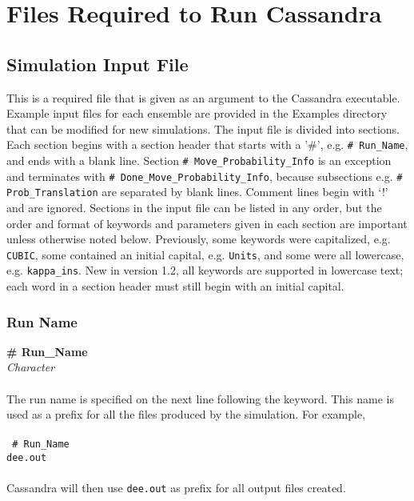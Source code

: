 \chapter{Files Required to Run Cassandra}
\label{ch:input_files}

\section{Simulation Input File} \label{sec:Input_File}
This is a required file that is given as an argument to the Cassandra executable.
Example input files for each ensemble are provided in the Examples directory that can be
modified for new simulations.
The input file is divided into sections.
Each section begins with a section header that starts with a '\#',
e.g. {\tt\# Run\_Name}, and ends with a blank line.
Section {\tt\# Move\_Probability\_Info} is an exception and terminates with
{\tt\# Done\_Move\_Probability\_Info}, because subsections
e.g. {\tt\# Prob\_Translation} are separated by blank lines.
Comment lines begin with `!' and are ignored.
Sections in the input file can be listed in any order,
but the order and format of keywords and parameters given in each section
are important unless otherwise noted below.
Previously, some keywords were capitalized, e.g. {\tt CUBIC},
some contained an initial capital, e.g. {\tt Units},
and some were all lowercase, e.g. {\tt kappa\_ins}.
New in version 1.2, all keywords are supported in lowercase text;
each word in a section header must still begin with an initial capital.
%
%
%
\subsection{Run Name}\label{sec:Run_Name}
{\bf \# Run\_Name}\\
{\it Character} \\ \\
%
The run name is specified on the next line following the keyword. This name is used as a prefix for all the files
produced by the simulation. For example,\\ \\
%
{\tt{
\# Run\_Name \\
dee.out
}} \\ \\
%
Cassandra will then use \texttt{dee.out} as prefix for all output files created.


